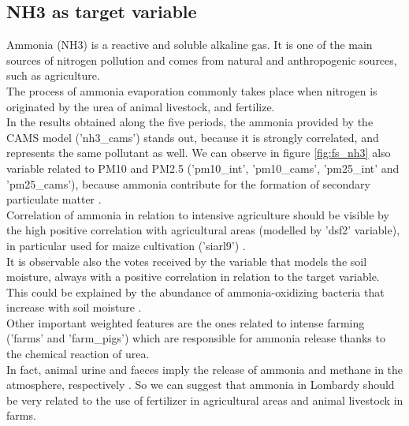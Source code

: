 \subsection{NH3 as target variable}
Ammonia (NH3) is a reactive and soluble alkaline gas. It is one of the main sources of nitrogen pollution and comes from natural and anthropogenic sources, such as agriculture.\\
The process of ammonia evaporation commonly takes place when nitrogen is originated by the urea of animal livestock, and fertilize. \\
In the results obtained along the five periods, the ammonia provided by the CAMS model ('nh3\_cams') stands out, because it is strongly correlated, and represents the same pollutant as well.
We can observe in figure \ref{fig:fs_nh3} also variable related to PM10 and PM2.5 ('pm10\_int', 'pm10\_cams', 'pm25\_int' and 'pm25\_cams'), because ammonia contribute for the formation of secondary particulate matter \cite{dai2019concentrations} \cite{zhu2015sources}.\\
Correlation of ammonia in relation to intensive agriculture should be visible by the high positive correlation with agricultural areas (modelled by 'dsf2' variable), in particular used for maize cultivation ('siarl9') .\\
It is observable also the votes received by the variable that models the soil moisture, always with a positive correlation in relation to the target variable. This could be explained by the abundance of ammonia-oxidizing bacteria that increase with soil moisture \cite{avrahami2007response}.  \\
Other important weighted features are the ones related to intense farming ('farms' and 'farm\_pigs') which are responsible for ammonia release thanks to the chemical reaction of urea.\\
In fact, animal urine and faeces imply the release of ammonia and methane in the atmosphere, respectively \cite{saggar2004review}.
So we can suggest that ammonia in Lombardy should be very related to the use of fertilizer in agricultural areas and animal livestock in farms.
\bigbreak
\pagebreak
\clearpage
